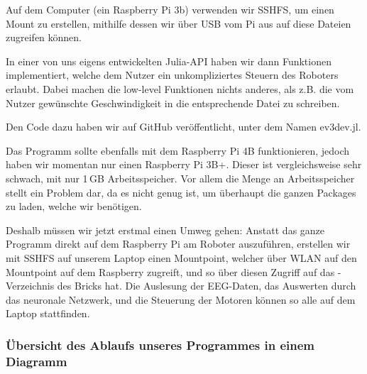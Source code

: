 \documentclass[11pt]{scrartcl}
\begin{document}
	Auf dem Computer (ein Raspberry Pi 3b) verwenden wir SSHFS, um einen Mount zu erstellen, mithilfe dessen wir über USB vom Pi aus auf diese Dateien zugreifen können.

	In einer von uns eigens entwickelten Julia-API haben wir dann Funktionen implementiert, welche dem Nutzer ein unkompliziertes Steuern des Roboters erlaubt. Dabei machen die low-level Funktionen nichts anderes, als z.B. die vom Nutzer gewünschte Geschwindigkeit in die entsprechende Datei zu schreiben.

	Den Code dazu haben wir auf GitHub veröffentlicht, unter dem Namen ev3dev.jl. \cite{ev3dev}

	Das Programm sollte ebenfalls mit dem Raspberry Pi 4B funktionieren, jedoch haben wir momentan nur einen Raspberry Pi 3B+. Dieser ist vergleichsweise sehr schwach, mit nur 1\,GB Arbeitsspeicher. Vor allem die Menge an Arbeitsspeicher stellt ein Problem dar, da es nicht genug ist, um überhaupt die ganzen Packages zu laden, welche wir benötigen.

	Deshalb müssen wir jetzt erstmal einen Umweg gehen: Anstatt das ganze Programm direkt auf dem Raspberry Pi am Roboter auszuführen, erstellen wir mit SSHFS auf unserem Laptop einen Mountpoint, welcher über WLAN auf den Mountpoint auf dem Raspberry zugreift, und so über diesen Zugriff auf das -Verzeichnis des Bricks hat. Die Auslesung der EEG-Daten, das Auswerten durch das neuronale Netzwerk, und die Steuerung der Motoren können so alle auf dem Laptop stattfinden.
	

	\subsubsection{Übersicht des Ablaufs unseres Programmes in einem Diagramm}
	\begin{figure}[H]
	\end{figure}
\end{document}
